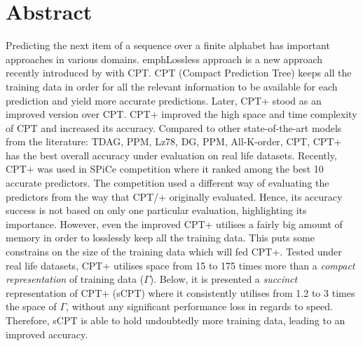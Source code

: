 \begin{comment}
							

\end{comment}

\section*{Abstract}
Predicting the next item of a sequence over a finite alphabet has important approaches in various domains. emph{Lossless} approach is a new approach  recently introduced by \citeauthor{gueniche_fournier-viger_tseng_2013} \citeyear{gueniche_fournier-viger_tseng_2013} with CPT. CPT (Compact Prediction Tree) keeps all the training data in order for all the relevant information to be available for each prediction and yield more accurate predictions. Later, CPT+ \cite{gueniche_fournier-viger_raman_tseng_2015} stood as an improved version over CPT. CPT+ improved the high space and time complexity of CPT and increased its accuracy. Compared to other state-of-the-art models from the literature: TDAG, PPM, Lz78, DG, PPM, All-K-order, CPT, CPT+ has the best overall accuracy under evaluation on real life datasets. Recently, CPT+ was used in SPiCe \cite{balle:hal-01399429} competition where it ranked among the best 10 accurate predictors. The competition used a different way of evaluating the predictors from the way that CPT/+ originally evaluated. Hence, its accuracy success is not based on only one particular evaluation, highlighting its importance. However, even the improved CPT+ utilises a fairly big amount of memory in order to losslessly keep all the training data. This puts some constrains on the size of the training data which will fed CPT+. Tested under real life datasets, CPT+ utilises space from 15 to 175 times more than a \emph{compact representation} of training data (\(\Gamma\)). Below, it is presented a \emph{succinct} representation of CPT+ (sCPT) where it consistently utilises from 1.2 to 3 times the space of \(\Gamma\), without any significant performance loss in regards to speed. Therefore, sCPT is able to hold undoubtedly more training data, leading to an improved accuracy.


